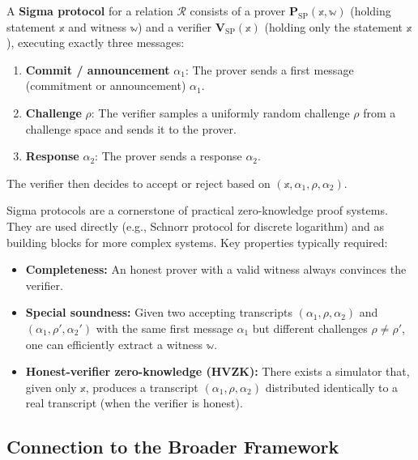\documentclass[11pt]{article}
\begin{document}
\begin{definitionbox}
  A \textbf{Sigma protocol} for a relation $\mathcal{R}$ consists of a prover
  $\mathbf{P}_{\mathrm{SP}}(\mathbb{x}, \mathbb{w})$ (holding statement $\mathbb{x}$ and
  witness $\mathbb{w}$) and a verifier $\mathbf{V}_{\mathrm{SP}}(\mathbb{x})$
  (holding only the statement $\mathbb{x}$), executing exactly three messages:
  \begin{enumerate}
    \item \textbf{Commit / announcement} $\alpha_1$: The prover sends a first message
      (commitment or announcement) $\alpha_1$.
    \item \textbf{Challenge} $\rho$: The verifier samples a uniformly random challenge
      $\rho$ from a challenge space and sends it to the prover.
    \item \textbf{Response} $\alpha_2$: The prover sends a response $\alpha_2$.
  \end{enumerate}
  The verifier then decides to accept or reject based on $(\mathbb{x}, \alpha_1, \rho,
  \alpha_2)$.
\end{definitionbox}

\begin{remark}
  Sigma protocols are a cornerstone of practical zero-knowledge proof systems.  They are
  used directly (e.g., Schnorr protocol for discrete logarithm) and as building blocks for
  more complex systems.  Key properties typically required:
  \begin{itemize}
    \item \textbf{Completeness:} An honest prover with a valid witness always convinces
      the verifier.
    \item \textbf{Special soundness:} Given two accepting transcripts
      $(\alpha_1, \rho, \alpha_2)$ and $(\alpha_1, \rho', \alpha_2')$ with the same
      first message $\alpha_1$ but different challenges $\rho \neq \rho'$, one can
      efficiently extract a witness $\mathbb{w}$.
    \item \textbf{Honest-verifier zero-knowledge (HVZK):} There exists a simulator that,
      given only $\mathbb{x}$, produces a transcript $({\alpha_1, \rho, \alpha_2})$
      distributed identically to a real transcript (when the verifier is honest).
  \end{itemize}
\end{remark}

\subsection{Connection to the Broader Framework}
\end{document}
